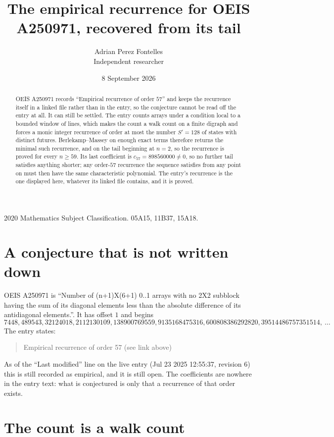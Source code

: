 \documentclass[11pt,a4paper]{article}
\title{The empirical recurrence for OEIS A250971, recovered from its tail}
\author{Adrian Perez Fontelles\\ \small Independent researcher}
\date{8 September 2026}
\theoremstyle{plain}
\theoremstyle{definition}
\begin{document}
\maketitle

\begin{abstract}
OEIS A250971 records ``Empirical recurrence of order $57$'' and keeps the recurrence itself in
a linked file rather than in the entry, so the conjecture cannot be read off the entry at all.
It can still be settled. The entry counts arrays under a condition local to a bounded window of
lines, which makes the count a walk count on a finite digraph and forces a monic integer
recurrence of order at most the number $S'=128$ of states with distinct futures. Berlekamp--Massey on
enough exact terms therefore returns the minimal such recurrence, and on the tail beginning at $n=2$, so the recurrence is proved for every $n\ge59$.
Its last coefficient is $c_{57}=898560000\neq0$, so no further tail satisfies anything
shorter; any order-$57$ recurrence the sequence satisfies from any point on must then have
the same characteristic polynomial. The entry's recurrence is the one displayed here, whatever
its linked file contains, and it is proved.
\end{abstract}

\noindent\small 2020 Mathematics Subject Classification. 05A15, 11B37, 15A18.\normalsize

\section{A conjecture that is not written down}

OEIS A250971 is ``Number of (n+1)X(6+1) 0..1 arrays with no 2X2 subblock having the sum of its diagonal elements less than the absolute difference of its antidiagonal elements.''. It has offset $1$ and begins
\[
7448, 489543, 32124018, 2112130109, 138900769559, 9135168475316, 600808386292820, 39514486757351514,\ \dots
\]
The entry states:
\begin{quote}
Empirical recurrence of order 57 (see link above)
\end{quote}
As of the ``Last modified'' line on the live entry (Jul 23 2025 12:55:37, revision 6)
this is still recorded as empirical, and it is still open. The coefficients are nowhere in the
entry text: what is conjectured is only that a recurrence of that order exists.

\section{The count is a walk count}
\end{document}
